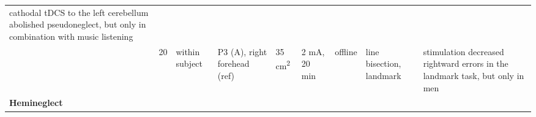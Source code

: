 \documentclass[11pt,english,]{memoir}
\begin{document}
\begin{longtable}[]{@{}lllllllll@{}}
\begin{minipage}[t]{0.28\columnwidth}
cathodal tDCS to the left cerebellum abolished
pseudoneglect, but only in combination with music listening\strut
\end{minipage}\tabularnewline
\begin{minipage}[t]{0.09\columnwidth}\raggedright
\textcite{DeTommaso2014}\strut
\end{minipage} & \begin{minipage}[t]{0.02\columnwidth}\raggedright
20\strut
\end{minipage} & \begin{minipage}[t]{0.04\columnwidth}\raggedright
within
subject\strut
\end{minipage} & \begin{minipage}[t]{0.10\columnwidth}\raggedright
P3 (A), right
forehead (ref)\strut
\end{minipage} & \begin{minipage}[t]{0.04\columnwidth}\raggedright
35
cm\textsuperscript{2}\strut
\end{minipage} & \begin{minipage}[t]{0.04\columnwidth}\raggedright
2 mA,
20 min\strut
\end{minipage} & \begin{minipage}[t]{0.04\columnwidth}\raggedright
offline\strut
\end{minipage} & \begin{minipage}[t]{0.10\columnwidth}\raggedright
line bisection,
landmark\strut
\end{minipage} & \begin{minipage}[t]{0.28\columnwidth}\raggedright
stimulation decreased rightward errors in the landmark task,
but only in men\strut
\end{minipage}\tabularnewline
\begin{minipage}[t]{0.09\columnwidth}\raggedright
\textbf{Hemineglect}\strut
\end{minipage} & \begin{minipage}[t]{0.02\columnwidth}\raggedright
\strut
\end{minipage} & \begin{minipage}[t]{0.04\columnwidth}\raggedright
\strut
\end{minipage} & \begin{minipage}[t]{0.10\columnwidth}\raggedright
\strut
\end{minipage} & \begin{minipage}[t]{0.04\columnwidth}\raggedright
\strut
\end{minipage} & \begin{minipage}[t]{0.04\columnwidth}\raggedright

\end{minipage}
\end{longtable}
\end{document}
